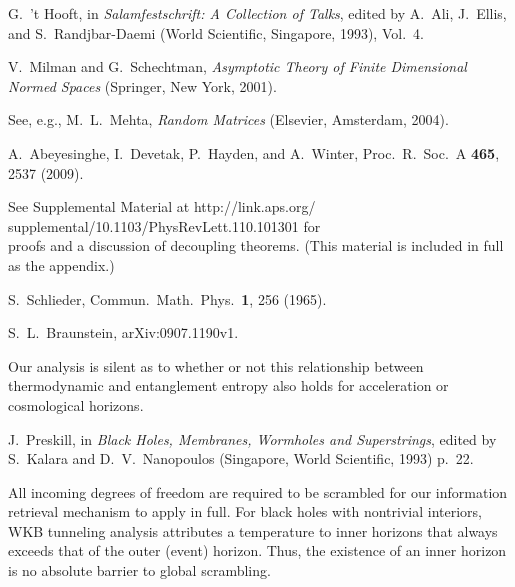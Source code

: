 \documentclass[aps,showpacs,prl,12pt]{revtex4}
\begin{document}
\begin{thebibliography}{16}
 G.\ 't Hooft,
in {\it Salamfestschrift: A Collection of Talks}, 
edited by A.\ Ali, J.\ Ellis, and S.\ Randjbar-Daemi
(World Scientific, Singapore, 1993), Vol.\ 4.

 V.\ Milman and G.\ Schechtman,
{\it Asymptotic Theory of Finite Dimensional Normed Spaces\/}
(Springer, New York, 2001).

 See, e.g., M.\ L.\ Mehta,
{\it Random Matrices\/}
(Elsevier, Amsterdam, 2004).

 A.\ Abeyesinghe, 
I.\ Devetak, P.\ Hayden, and A.\ Winter,
Proc.\ R.\ Soc.\ A {\bf 465}, 2537 (2009). 

 See Supplemental Material at
http://link.aps.org/\\
supplemental/10.1103/PhysRevLett.110.101301
for\\
proofs and a discussion of decoupling theorems.
(This material is included in full as the appendix.)

 S.\ Schlieder,
Commun.\ Math.\ Phys.\ {\bf 1}, 256 (1965).

 S.\ L.\ Braunstein, arXiv:0907.1190v1.

 Our analysis is silent as to whether or not this
relationship between thermodynamic and entanglement entropy also
holds for acceleration or cosmological horizons.


 J.\ Preskill,
in {\it Black Holes, Membranes, Wormholes and Superstrings},
edited by S.\ Kalara and D.\ V.\ Nanopoulos
(Singapore, World Scientific, 1993) p.~22.

 All incoming degrees of freedom are required to be scrambled
for our information retrieval mechanism to apply in full. For black
holes with nontrivial interiors,
WKB tunneling analysis attributes a temperature to inner horizons
that always exceeds that of the outer
(event) horizon. Thus, the existence of an inner horizon is no absolute
barrier to global scrambling.


\end{thebibliography}
\end{document}
